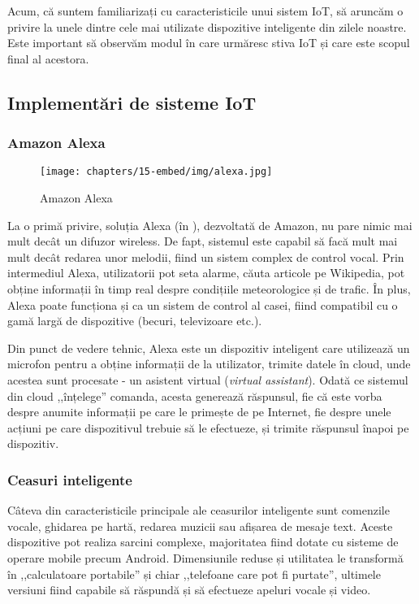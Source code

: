 Acum, că suntem familiarizați cu caracteristicile unui sistem IoT, să aruncăm o
privire la unele dintre cele mai utilizate dispozitive inteligente din zilele
noastre. Este important să observăm modul în care urmăresc stiva IoT și care
este scopul final al acestora.

\subsection{Implementări de sisteme IoT}
\label{sec:embed:iot:impl}

\subsubsection{Amazon Alexa}
\label{sec:embed:iot:impl:alexa}

\begin{figure}[!htbp]
  \centering
  \texttt{[image: chapters/15-embed/img/alexa.jpg]}
  \caption{Amazon Alexa}
  \label{fig:embed:alexa}
\end{figure}

La o primă privire, soluția Alexa (în ), dezvoltată de Amazon, nu pare nimic mai mult
decât un difuzor wireless. De fapt, sistemul este capabil să facă mult mai mult
decât redarea unor melodii, fiind un sistem complex de control vocal. Prin
intermediul Alexa, utilizatorii pot seta alarme, căuta articole pe
Wikipedia, pot obține informații în timp real despre condițiile
meteorologice și de trafic. În plus, Alexa poate funcționa și ca un sistem de
control al casei, fiind compatibil cu o gamă largă de dispozitive (becuri,
televizoare etc.).

Din punct de vedere tehnic, Alexa este un dispozitiv inteligent care utilizează
un microfon pentru a obține informații de la utilizator, trimite datele în
cloud, unde acestea sunt procesate - un asistent virtual (\textit{virtual assistant}). Odată ce sistemul din cloud ,,înțelege''
comanda, acesta generează răspunsul, fie că este vorba despre anumite informații
pe care le primește de pe Internet, fie despre unele acțiuni pe care
dispozitivul trebuie să le efectueze, și trimite răspunsul înapoi pe dispozitiv.

\subsubsection{Ceasuri inteligente}
\label{sec:embed:iot:impl:smartwatch}

Câteva din caracteristicile principale ale ceasurilor inteligente sunt comenzile
vocale, ghidarea pe hartă, redarea muzicii sau afișarea de mesaje text. Aceste
dispozitive pot realiza sarcini complexe, majoritatea fiind
dotate cu sisteme de operare mobile precum Android. Dimensiunile reduse și
utilitatea le transformă în ,,calculatoare portabile'' și chiar ,,telefoane care
pot fi purtate'', ultimele versiuni fiind capabile să răspundă și să efectueze
apeluri vocale și video.

